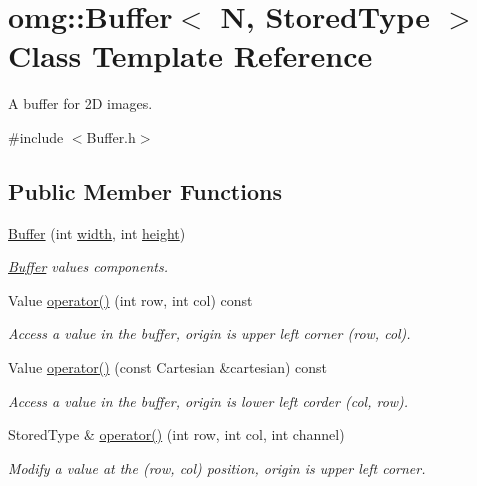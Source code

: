 \hypertarget{classomg_1_1_buffer}{}\section{omg\+::Buffer$<$ N, Stored\+Type $>$ Class Template Reference}
\label{classomg_1_1_buffer}


A buffer for 2D images.  




{\ttfamily \#include $<$Buffer.\+h$>$}

\subsection*{Public Member Functions}
\begin{DoxyCompactItemize}
\item 
\mbox{\hyperlink{classomg_1_1_buffer_aea5eaa6530d6506d47a4efee72485c42}{Buffer}} (int \mbox{\hyperlink{classomg_1_1_buffer_aa5b24d2a6fb4b994561d2558a640da65}{width}}, int \mbox{\hyperlink{classomg_1_1_buffer_aa6be8a001e33259c8c5c3e3f20eedbc9}{height}})
\begin{DoxyCompactList}\small\item\em \mbox{\hyperlink{classomg_1_1_buffer}{Buffer}} values components. \end{DoxyCompactList}\item 
Value \mbox{\hyperlink{classomg_1_1_buffer_ae9b4a3c2c3357ca29b1b1847c303b1f7}{operator()}} (int row, int col) const
\begin{DoxyCompactList}\small\item\em Access a value in the buffer, origin is upper left corner (row, col). \end{DoxyCompactList}\item 
Value \mbox{\hyperlink{classomg_1_1_buffer_ace3b3a40c6fbc8909af82638b9277a47}{operator()}} (const Cartesian \&cartesian) const
\begin{DoxyCompactList}\small\item\em Access a value in the buffer, origin is lower left corder (col, row). \end{DoxyCompactList}\item 
Stored\+Type \& \mbox{\hyperlink{classomg_1_1_buffer_aa7c3e86a02ffd0801cdff9c03222afb6}{operator()}} (int row, int col, int channel)
\begin{DoxyCompactList}\small\item\em Modify a value at the (row, col) position, origin is upper left corner. \end{DoxyCompactList}\item 

\end{DoxyCompactItemize}
